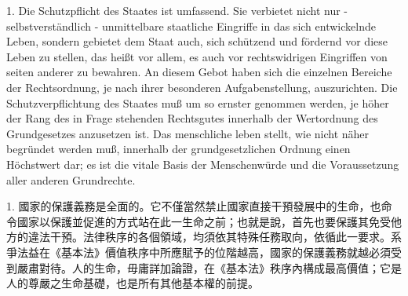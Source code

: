 \documentclass[12pt]{article}
\begin{document}
\syncleft
\begin{sourcepara}
1. Die Schutzpflicht des Staates ist umfassend. Sie verbietet nicht nur - selbstverständlich - unmittelbare staatliche Eingriffe in das sich entwickelnde Leben, sondern gebietet dem Staat auch, sich schützend und fördernd vor diese Leben zu stellen, das heißt vor allem, es auch vor rechtswidrigen Eingriffen von seiten anderer zu bewahren. An diesem Gebot haben sich die einzelnen Bereiche der Rechtsordnung, je nach ihrer besonderen Aufgabenstellung, auszurichten. Die Schutzverpflichtung des Staates muß um so ernster genommen werden, je höher der Rang des in Frage stehenden Rechtsgutes innerhalb der Wertordnung des Grundgesetzes anzusetzen ist. Das menschliche leben stellt, wie nicht näher begründet werden muß, innerhalb der grundgesetzlichen Ordnung einen Höchstwert dar; es ist die vitale Basis der Menschenwürde und die Voraussetzung aller anderen Grundrechte.
\end{sourcepara}
\begin{transpara}
1. 國家的保護義務是全面的。它不僅當然禁止國家直接干預發展中的生命，也命令國家以保護並促進的方式站在此一生命之前；也就是說，首先也要保護其免受他方的違法干預。法律秩序的各個領域，均須依其特殊任務取向，依循此一要求。系爭法益在《基本法》價值秩序中所應賦予的位階越高，國家的保護義務就越必須受到嚴肅對待。人的生命，毋庸詳加論證，在《基本法》秩序內構成最高價值；它是人的尊嚴之生命基礎，也是所有其他基本權的前提。
\end{transpara}
\end{document}
